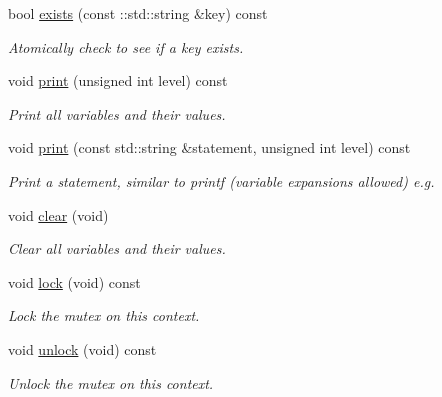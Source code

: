 \begin{DoxyCompactItemize}
bool \hyperlink{classMadara_1_1Knowledge__Engine_1_1Thread__Safe__Context_a81bc0d2cca2772d1cc2b59b5438466b2}{exists} (const ::std::string \&key) const 
\begin{DoxyCompactList}\small\item\em Atomically check to see if a key exists. \item\end{DoxyCompactList}\item 
void \hyperlink{classMadara_1_1Knowledge__Engine_1_1Thread__Safe__Context_a8568b009fb314eafc72008ae04d61216}{print} (unsigned int level) const 
\begin{DoxyCompactList}\small\item\em Print all variables and their values. \item\end{DoxyCompactList}\item 
void \hyperlink{classMadara_1_1Knowledge__Engine_1_1Thread__Safe__Context_a31ad60e0ba7ce73913faa8859a3c00a4}{print} (const std::string \&statement, unsigned int level) const 
\begin{DoxyCompactList}\small\item\em Print a statement, similar to printf (variable expansions allowed) e.g. \item\end{DoxyCompactList}\item 
void \hyperlink{classMadara_1_1Knowledge__Engine_1_1Thread__Safe__Context_aefdf0e91933a447ededc6a1e28828a0a}{clear} (void)
\begin{DoxyCompactList}\small\item\em Clear all variables and their values. \item\end{DoxyCompactList}\item 
void \hyperlink{classMadara_1_1Knowledge__Engine_1_1Thread__Safe__Context_acaf3bd7f1949fe90c691500e96b637d1}{lock} (void) const 
\begin{DoxyCompactList}\small\item\em Lock the mutex on this context. \item\end{DoxyCompactList}\item 
void \hyperlink{classMadara_1_1Knowledge__Engine_1_1Thread__Safe__Context_aea7de1117389c07d3db0d6fc51da3e22}{unlock} (void) const 
\begin{DoxyCompactList}\small\item\em Unlock the mutex on this context. \item\end{DoxyCompactList}\item 

\end{DoxyCompactItemize}
